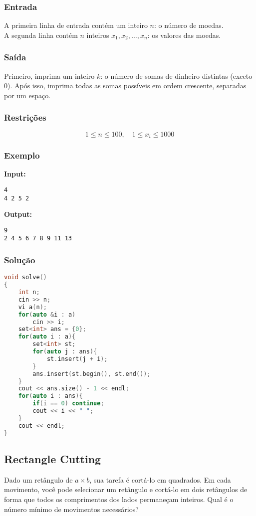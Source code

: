 \subsubsection*{Entrada}
A primeira linha de entrada contém um inteiro \( n \): o número de moedas.\\
A segunda linha contém \( n \) inteiros \( x_1, x_2, \dots, x_n \): os valores das moedas.

\subsubsection*{Saída}
Primeiro, imprima um inteiro \( k \): o número de somas de dinheiro distintas (exceto 0). Após isso, imprima todas as somas possíveis em ordem crescente, separadas por um espaço.

\subsubsection*{Restrições}
\[
1 \le n \le 100,\quad 1 \le x_i \le 1000
\]

\subsubsection*{Exemplo}

\textbf{Input:}
\begin{verbatim}
4
4 2 5 2
\end{verbatim}

\textbf{Output:}
\begin{verbatim}
9
2 4 5 6 7 8 9 11 13
\end{verbatim}

\subsubsection*{Solução}
\begin{lstlisting}[language=C++]
void solve()
{
    int n; 
    cin >> n;
    vi a(n);
    for(auto &i : a) 
        cin >> i;
    set<int> ans = {0};
    for(auto i : a){
        set<int> st;
        for(auto j : ans){
            st.insert(j + i);
        }
        ans.insert(st.begin(), st.end());
    }
    cout << ans.size() - 1 << endl;
    for(auto i : ans){
        if(i == 0) continue;
        cout << i << " ";
    }
    cout << endl;
}
\end{lstlisting}

\subsection{Rectangle Cutting}
Dado um retângulo de \( a \times b \), sua tarefa é cortá-lo em quadrados. Em cada movimento, você pode selecionar um retângulo e cortá-lo em dois retângulos de forma que todos os comprimentos dos lados permaneçam inteiros. Qual é o número mínimo de movimentos necessários?

